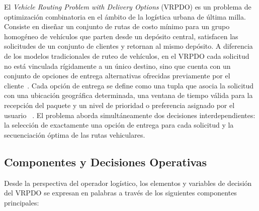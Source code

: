\documentclass[letter, 10pt]{article}
\begin{document}
El \emph{Vehicle Routing Problem with Delivery Options} (VRPDO) es un problema de optimización combinatoria en el ámbito de la logística urbana de última milla. Consiste en diseñar un conjunto de rutas de costo mínimo para un grupo homogéneo de vehículos que parten desde un depósito central, satisfacen las solicitudes de un conjunto de clientes y retornan al mismo depósito. A diferencia de los modelos tradicionales de ruteo de vehículos, en el VRPDO cada solicitud no está vinculada rígidamente a un único destino, sino que cuenta con un conjunto de opciones de entrega alternativas ofrecidas previamente por el cliente~\cite{ Dumez21Large, Tilk21LastMile}. 
Cada opción de entrega se define como una tupla que asocia la solicitud con una ubicación geográfica determinada, una ventana de tiempo válida para la recepción del paquete y un nivel de prioridad o preferencia asignado por el usuario ~\cite{Tilk21LastMile, Yang25Neighborhood}. 
El problema aborda simultáneamente dos decisiones interdependientes: la selección de exactamente una opción de entrega para cada solicitud y la secuenciación óptima de las rutas vehiculares. \subsection{Componentes y Decisiones Operativas} Desde la perspectiva del operador logístico, los elementos y variables de decisión del VRPDO se expresan en palabras a través de los siguientes componentes principales: 
\end{document}
